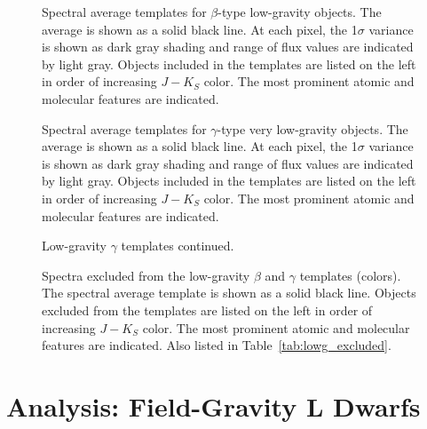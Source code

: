 \documentclass[modern,trackchanges]{aastex61}
\begin{document}
\clearpage
\begin{figure}
  \caption{Spectral average templates for $\beta$-type low-gravity objects. The average is shown as a solid black line. At each pixel, the 1$\sigma$ variance is shown as dark gray shading and range of flux values are indicated by light gray. Objects included in the templates are listed on the left in order of increasing $J-K_S$ color. The most prominent atomic and molecular features are indicated. }
  \label{fig:beta_templates}
\end{figure}

\begin{figure}
  \caption{Spectral average templates for $\gamma$-type very low-gravity objects. The average is shown as a solid black line. At each pixel, the 1$\sigma$ variance is shown as dark gray shading and range of flux values are indicated by light gray. Objects included in the templates are listed on the left in order of increasing $J-K_S$ color. The most prominent atomic and molecular features are indicated. }
  \label{fig:gamma_templates}
\end{figure}

\begin{figure}
  \caption{Low-gravity $\gamma$ templates continued.}
\end{figure}

\begin{figure}
  \caption{Spectra excluded from the low-gravity $\beta$ and $\gamma$ templates (colors). The spectral average template is shown as a solid black line. Objects excluded from the templates are listed on the left in order of increasing $J-K_S$ color. The most prominent atomic and molecular features are indicated. Also listed in Table~\ref{tab:lowg_excluded}.}
  \label{fig:lowg_excluded}
\end{figure}

\clearpage



\clearpage



\section{Analysis: Field-Gravity L Dwarfs}
\label{sec:fieldg}
\end{document}
